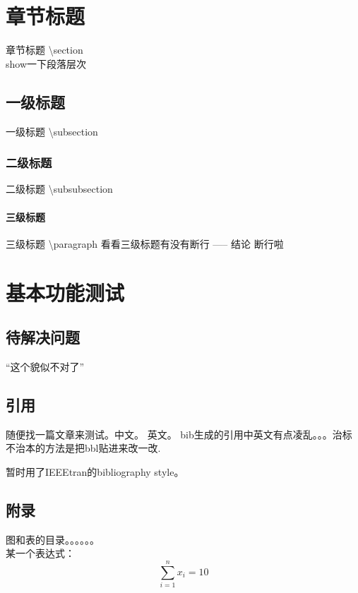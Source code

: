 \section{章节标题}
	章节标题 \textbackslash section \\
	show一下段落层次
\subsection{一级标题} 
	一级标题 \textbackslash subsection
	
\subsubsection{二级标题}
	二级标题 \textbackslash subsubsection
	
\paragraph{三级标题}
	三级标题 \textbackslash paragraph
看看三级标题有没有断行 ----- 结论 断行啦\\




\section{基本功能测试}
\subsection{待解决问题}
	``这个貌似不对了''
		

	
\subsection{引用}
	随便找一篇文章来测试。中文\cite{余胜泉2000}。 英文\cite{liu2010system}。
	bib生成的引用中英文有点凌乱。。。治标不治本的方法是把bbl贴进来改一改.
	
	暂时用了IEEEtran的bibliography style。


\subsection{附录}

	图和表的目录。。。。。。\\
	某一个表达式：
	\begin{equation}
	 \sum_{i=1}^{n}x_i = 10
	\end{equation}
	





